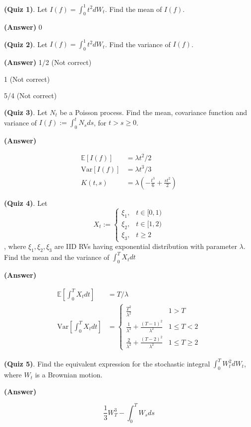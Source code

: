 \documentclass[12pt]{article}
\theoremstyle{nonumberbreak}
\begin{document}
\textbf{(Quiz 1)}. Let $I(f) = \int_0^1 t^2 dW_t$. Find the mean of $I(f)$. 

\textbf{(Answer)} 0


\textbf{(Quiz 2)}. Let $I(f) = \int_0^1 t^2 dW_t$. Find the variance of $I(f)$. 

\textbf{(Answer)} 1/2 (Not correct)

1 (Not correct)

5/4 (Not correct)

\textbf{(Quiz 3)}. Let $N_t$ be a Poisson process. Find the mean, covariance function and variance of $I(f) := \int_0^t N_s ds$, for $t > s \ge 0$. 

\textbf{(Answer)} 

$$
\begin{aligned}
\mathbb{E}[I(f)] &= \lambda t^2 /2 \\[8pt]
\mathrm{Var}[I(f)] &= \lambda t^3 /3 \\[8pt]
K(t,s) &= \lambda \left( -\frac{t^3}{6} + \frac{st^2}{2} \right)
\end{aligned}
$$


\textbf{(Quiz 4)}. Let 
$$
X_t := \begin{cases}
\xi_1, &t \in [0, 1) \\
\xi_2, &t \in [1, 2) \\
\xi_3, &t \ge 2
\end{cases}
$$, where $\xi_1, \xi_2, \xi_3$ are IID RVs having exponential distribution with parameter $\lambda$. Find the mean and the variance of $\int_0^T X_t dt$

\textbf{(Answer)} 

$$
\begin{aligned}
\mathbb{E}[\int_0^T X_t dt] &= T/\lambda \\[8pt]
\mathrm{Var}[\int_0^T X_t dt] &= \begin{cases}
\frac{T^2}{\lambda^2} & 1 > T \\
\frac{1}{\lambda^2} + \frac{(T-1)^2}{\lambda^2} & 1 \le T < 2 \\
\frac{2}{\lambda^2} + \frac{(T-2)^2}{\lambda^2} & 1 \le T \ge 2
\end{cases}
\end{aligned}
$$


\textbf{(Quiz 5)}. Find the equivalent expression for the stochastic integral $\int_0^T W_t^2 dW_t$, where $W_t$ is a Brownian motion.


\textbf{(Answer)} 

$$
\frac{1}{3} W_T^3 - \int_0^T W_s ds
$$
\end{document}
